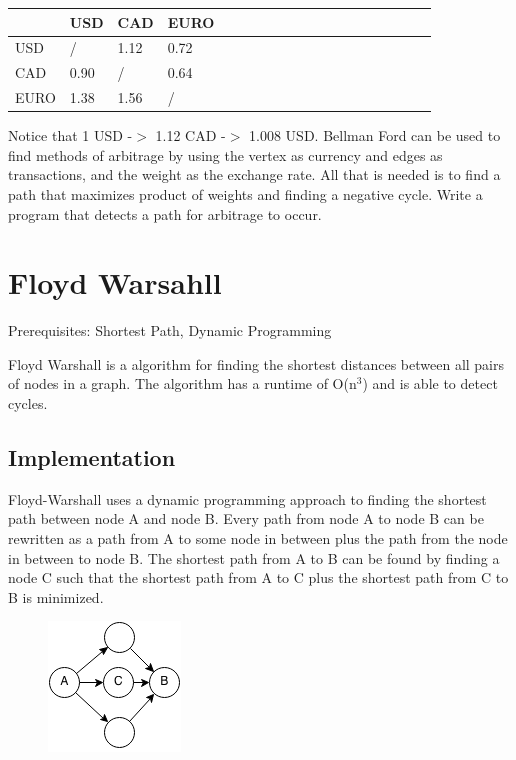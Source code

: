 \documentclass[11pt,oneside]{book}
\makeatletter
\def\maxwidth#1{\ifdim\Gin@nat@width>#1 #1\else\Gin@nat@width\fi}
\makeatother
\begin{document}
\begin{center}\begin{tabulary}{0.4\linewidth}{|l|l|l|l|l|l|l|l|l|l|l|l|l|l|l|l|l|l|l}\hline


   &
  USD &
  CAD &
  EURO\\
\hline


  USD &
  / &
  1.12 &
  0.72\\

  CAD &
  0.90 &
  / &
  0.64\\

  EURO &
  1.38 &
  1.56 &
  /\\

\hline\end{tabulary}\end{center}

Notice that 1 USD -$>$ 1.12 CAD -$>$ 1.008 USD. Bellman Ford can be used to find methods of arbitrage by using the vertex as currency and edges as transactions, and the weight as the exchange rate. All that is needed is to find a path that maximizes product of weights and finding a negative cycle. Write a program that detects a path for arbitrage to occur.

        \section{ Floyd Warsahll }
        

Prerequisites:  Shortest Path, Dynamic Programming

Floyd Warshall is a algorithm for finding the shortest distances between all pairs of nodes in a graph. The algorithm has a runtime of O(n$^{3}$) and is able to detect cycles.

\subsection{Implementation}

Floyd-Warshall uses a dynamic programming approach to finding the shortest path between node A and node B. Every path from node A to node B can be rewritten as a path from A to some node in between plus the path from the node in between to node B. The shortest path from A to B can be found by finding a node C such that the shortest path from A to C plus the shortest path from C to B is minimized.

\vspace{5px}\begin{figure}[H]\centering
        \includegraphics[width=0.66\maxwidth{\textwidth}]{floydwarshall1.png}
        \end{figure}
\end{document}
